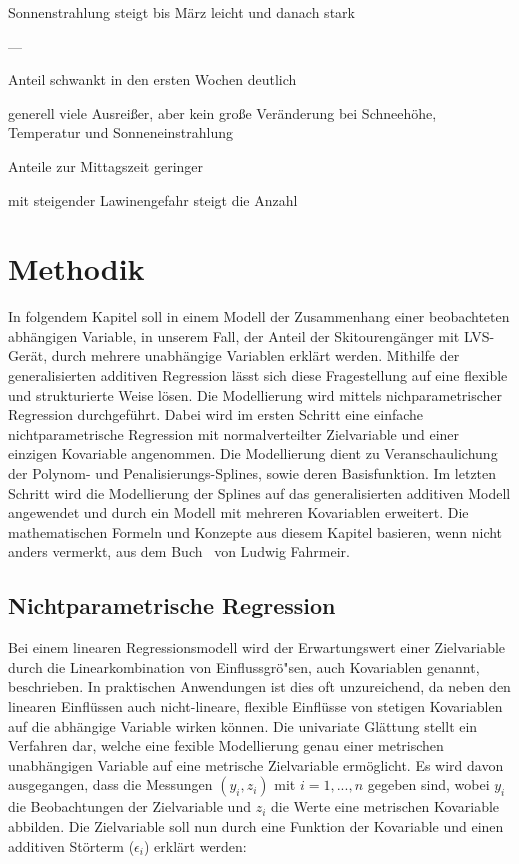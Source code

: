 \documentclass[12pt]{scrreprt}
\begin{document}
	
	
	Sonnenstrahlung steigt bis März leicht und danach stark
	
	
	
	
	
	---
	
	
	
	
	
	Anteil schwankt in den ersten Wochen deutlich
	
	
	
	generell viele Ausreißer, aber kein große Veränderung bei Schneehöhe, Temperatur und Sonneneinstrahlung
	
	
	
	Anteile zur Mittagszeit geringer
	
	
	
	mit steigender Lawinengefahr steigt die Anzahl
	
	
	
	\chapter{Methodik}
	In folgendem Kapitel soll in einem Modell der Zusammenhang einer beobachteten abhängigen Variable, in unserem Fall, der Anteil der Skitourengänger mit LVS-Gerät, durch mehrere unabhängige Variablen erklärt werden.
	Mithilfe der generalisierten additiven Regression lässt sich diese Fragestellung auf eine flexible und strukturierte Weise lösen. Die Modellierung wird mittels nichparametrischer Regression durchgeführt.
	Dabei wird im ersten Schritt eine einfache nichtparametrische Regression mit normalverteilter Zielvariable und einer einzigen Kovariable angenommen. Die Modellierung dient zu Veranschaulichung der Polynom- und Penalisierungs-Splines, sowie deren Basisfunktion. Im letzten Schritt wird die Modellierung der Splines auf das generalisierten additiven Modell angewendet und durch ein Modell mit mehreren Kovariablen erweitert. Die mathematischen Formeln und Konzepte aus diesem Kapitel basieren, wenn nicht anders vermerkt, aus dem Buch \grqq ~von Ludwig Fahrmeir. 
	
	\section{Nichtparametrische Regression}
	Bei einem linearen Regressionsmodell wird der Erwartungswert einer Zielvariable durch die Linearkombination von Einflussgrö"sen, auch Kovariablen genannt, beschrieben. In praktischen Anwendungen ist dies oft unzureichend, da neben den linearen Einflüssen auch nicht-lineare, flexible Einflüsse von stetigen Kovariablen auf die abhängige Variable wirken können.
	Die univariate Glättung stellt ein Verfahren dar, welche eine fexible Modellierung genau einer metrischen unabhängigen Variable auf eine metrische Zielvariable ermöglicht. Es wird davon ausgegangen, dass die Messungen $(y_{i},z_{i})$ mit $i=1,...,n$ gegeben sind, wobei $y_{i}$ die Beobachtungen der Zielvariable und $z_{i}$ die Werte eine metrischen Kovariable abbilden. Die Zielvariable soll nun durch eine Funktion der Kovariable und einen additiven Störterm ($\epsilon_{i}$) erklärt werden:
	
\end{document}
